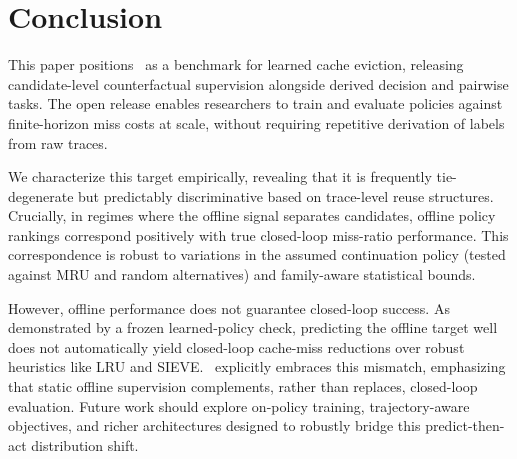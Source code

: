 \section{Conclusion}
\label{sec:conclusion}

This paper positions \lafc\ as a benchmark for learned cache eviction, releasing candidate-level counterfactual supervision alongside derived decision and pairwise tasks. The open release enables researchers to train and evaluate policies against finite-horizon miss costs at scale, without requiring repetitive derivation of labels from raw traces.

We characterize this target empirically, revealing that it is frequently tie-degenerate but predictably discriminative based on trace-level reuse structures. Crucially, in regimes where the offline signal separates candidates, offline policy rankings correspond positively with true closed-loop miss-ratio performance. This correspondence is robust to variations in the assumed continuation policy (tested against MRU and random alternatives) and family-aware statistical bounds.

However, offline performance does not guarantee closed-loop success. As demonstrated by a frozen learned-policy check, predicting the offline target well does not automatically yield closed-loop cache-miss reductions over robust heuristics like LRU and SIEVE. \lafc\ explicitly embraces this mismatch, emphasizing that static offline supervision complements, rather than replaces, closed-loop evaluation. Future work should explore on-policy training, trajectory-aware objectives, and richer architectures designed to robustly bridge this predict-then-act distribution shift.
